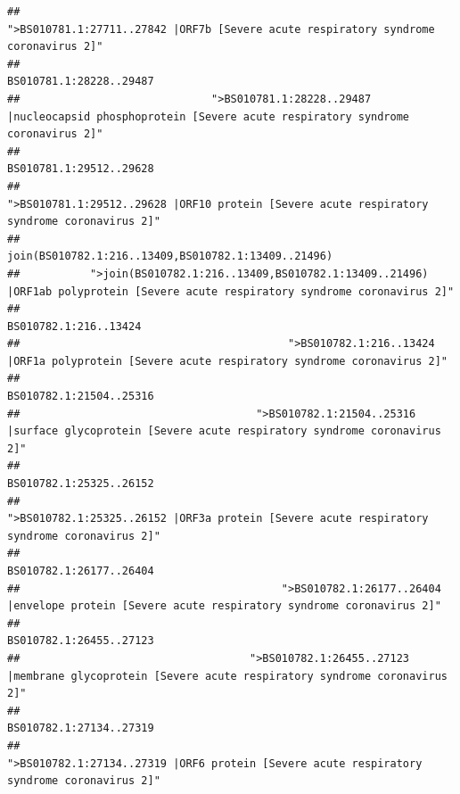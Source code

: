 \documentclass[
]{article}
\begin{document}
\begin{verbatim}
##                                                    ">BS010781.1:27711..27842 |ORF7b [Severe acute respiratory syndrome coronavirus 2]" 
##                                                                                                                BS010781.1:28228..29487 
##                              ">BS010781.1:28228..29487 |nucleocapsid phosphoprotein [Severe acute respiratory syndrome coronavirus 2]" 
##                                                                                                                BS010781.1:29512..29628 
##                                            ">BS010781.1:29512..29628 |ORF10 protein [Severe acute respiratory syndrome coronavirus 2]" 
##                                                                                    join(BS010782.1:216..13409,BS010782.1:13409..21496) 
##           ">join(BS010782.1:216..13409,BS010782.1:13409..21496) |ORF1ab polyprotein [Severe acute respiratory syndrome coronavirus 2]" 
##                                                                                                                  BS010782.1:216..13424 
##                                          ">BS010782.1:216..13424 |ORF1a polyprotein [Severe acute respiratory syndrome coronavirus 2]" 
##                                                                                                                BS010782.1:21504..25316 
##                                     ">BS010782.1:21504..25316 |surface glycoprotein [Severe acute respiratory syndrome coronavirus 2]" 
##                                                                                                                BS010782.1:25325..26152 
##                                            ">BS010782.1:25325..26152 |ORF3a protein [Severe acute respiratory syndrome coronavirus 2]" 
##                                                                                                                BS010782.1:26177..26404 
##                                         ">BS010782.1:26177..26404 |envelope protein [Severe acute respiratory syndrome coronavirus 2]" 
##                                                                                                                BS010782.1:26455..27123 
##                                    ">BS010782.1:26455..27123 |membrane glycoprotein [Severe acute respiratory syndrome coronavirus 2]" 
##                                                                                                                BS010782.1:27134..27319 
##                                             ">BS010782.1:27134..27319 |ORF6 protein [Severe acute respiratory syndrome coronavirus 2]" 

\end{verbatim}
\end{document}
